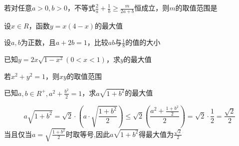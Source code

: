 \documentclass[11pt,a4paper]{ctexbook}
\begin{document}
\par
\begin{problem}
    若对任意$a>0,b>0$，不等式$\displaystyle \frac{2}{a}+\frac{1}{b} \ge \frac{m}{2a+b}$恒成立，则$m$的取值范围是\tiankong{$(-\infty,9]$}
\end{problem}

\par
\begin{problem}
    设$x\in R$，函数$y=x(4-x)$的最大值
\end{problem}

\par
\begin{problem}
    设$a,b$为正数，且$a+2b=1$，比较$ab$与$\displaystyle \frac{1}{8}$的值的大小
\end{problem}

\par
\begin{problem}
    已知$y=2x\sqrt{1-x^2}(0<x<1)$，求$y$的最大值
\end{problem}

\par
\begin{problem}
    若$x^2+y^2=1$，则$xy$的取值范围
\end{problem}

\par
\begin{problem}
    已知$\displaystyle a,b \in R^+,a^2+\frac{b^2}{2} = 1$，求$a\sqrt{1+b^2}$的最大值
    \begin{jiexi}
        $$\displaystyle a\sqrt{1+b^2}=\sqrt{2}\cdot(a\cdot \sqrt{\frac{1+b^2}{2}}) \le \sqrt{2}(\frac{a^2+\frac{1+b^2}{2}}{2}) = \sqrt{2}\cdot\frac{1}{2}=\frac{\sqrt{2}}{2}$$
        当且仅当$\displaystyle a=\sqrt{\frac{1+b^2}{2}}$时取等号,因此$a\sqrt{1+b^2}$得最大值为$\displaystyle \frac{\sqrt{2}}{2}$
    \end{jiexi}
\end{problem}
\end{document}
